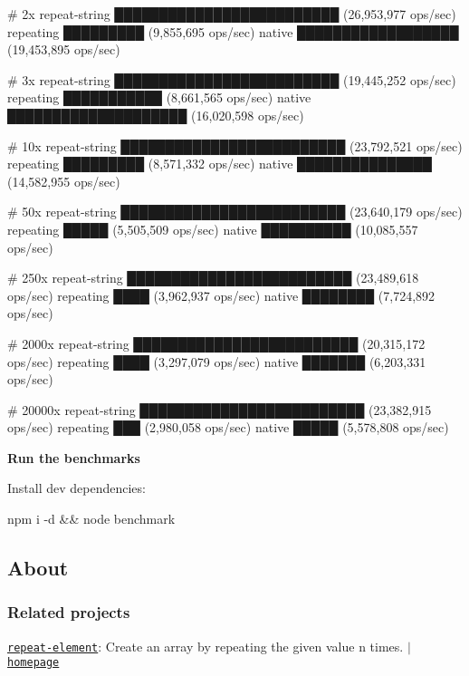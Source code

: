 \begin{DoxyCode}
# 2x
repeat-string  █████████████████████████  (26,953,977 ops/sec)
repeating      █████████                  (9,855,695 ops/sec)
native         ██████████████████         (19,453,895 ops/sec)

# 3x
repeat-string  █████████████████████████  (19,445,252 ops/sec)
repeating      ███████████                (8,661,565 ops/sec)
native         ████████████████████       (16,020,598 ops/sec)

# 10x
repeat-string  █████████████████████████  (23,792,521 ops/sec)
repeating      █████████                  (8,571,332 ops/sec)
native         ███████████████            (14,582,955 ops/sec)

# 50x
repeat-string  █████████████████████████  (23,640,179 ops/sec)
repeating      █████                      (5,505,509 ops/sec)
native         ██████████                 (10,085,557 ops/sec)

# 250x
repeat-string  █████████████████████████  (23,489,618 ops/sec)
repeating      ████                       (3,962,937 ops/sec)
native         ████████                   (7,724,892 ops/sec)

# 2000x
repeat-string  █████████████████████████  (20,315,172 ops/sec)
repeating      ████                       (3,297,079 ops/sec)
native         ███████                    (6,203,331 ops/sec)

# 20000x
repeat-string  █████████████████████████  (23,382,915 ops/sec)
repeating      ███                        (2,980,058 ops/sec)
native         █████                      (5,578,808 ops/sec)
\end{DoxyCode}


{\bfseries Run the benchmarks}

Install dev dependencies\+:


\begin{DoxyCode}
npm i -d && node benchmark
\end{DoxyCode}


\subsection*{About}

\subsubsection*{Related projects}

\href{https://www.npmjs.com/package/repeat-element}{\tt repeat-\/element}\+: Create an array by repeating the given value n times. $\vert$ \href{https://github.com/jonschlinkert/repeat-element}{\tt homepage}


